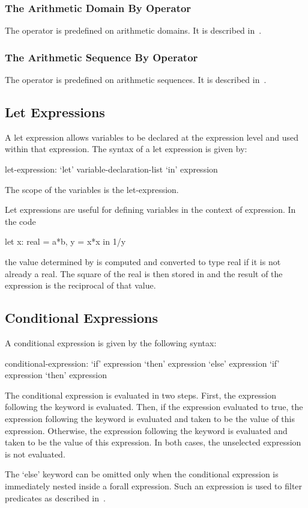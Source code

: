 \subsubsection{The Arithmetic Domain By Operator}
\label{The_Arithmetic_Domain_By_Operator}

The operator  is predefined on arithmetic domains.  It is
described in~.

\subsubsection{The Arithmetic Sequence By Operator}
\label{The_Sequence_By_Operator}

The operator  is predefined on arithmetic sequences.  It is
described in~.

\subsection{Let Expressions}
\label{Let_Expressions}

A let expression allows variables to be declared at the expression
level and used within that expression.  The syntax of a let expression
is given by:
\begin{syntax}
let-expression:
  `let' variable-declaration-list `in' expression
\end{syntax}
The scope of the variables is the let-expression.
\begin{example}
Let expressions are useful for defining variables in the context of
expression.  In the code
\begin{chapel}
  let x: real = a*b, y = x*x in 1/y
\end{chapel}
the value determined by  is computed and converted to type
real if it is not already a real.  The square of the real is then
stored in  and the result of the expression is the reciprocal
of that value.
\end{example}

\subsection{Conditional Expressions}
\label{Conditional_Expressions}

A conditional expression is given by the following syntax:
\begin{syntax}
conditional-expression:
  `if' expression `then' expression `else' expression
  `if' expression `then' expression
\end{syntax}
The conditional expression is evaluated in two steps.  First, the
expression following the  keyword is evaluated.  Then, if the
expression evaluated to true, the expression following the 
keyword is evaluated and taken to be the value of this expression.
Otherwise, the expression following the  keyword is
evaluated and taken to be the value of this expression.  In both
cases, the unselected expression is not evaluated.

The `else' keyword can be omitted only when the conditional expression
is immediately nested inside a forall expression.  Such an expression
is used to filter predicates as described
in~.
